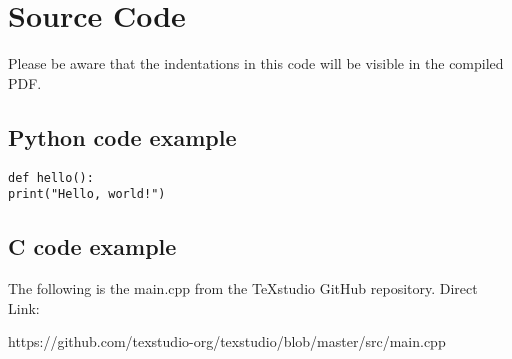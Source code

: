 \chapter{Source Code}

Please be aware that the indentations in this code will be visible in the compiled PDF.

\section{Python code example}

\begin{lstlisting}[style=pythonstyle]
def hello():
print("Hello, world!")
\end{lstlisting}
	
	
\section{C code example}

The following is the main.cpp from the TeXstudio GitHub repository. Direct Link:

https://github.com/texstudio-org/texstudio/blob/master/src/main.cpp

